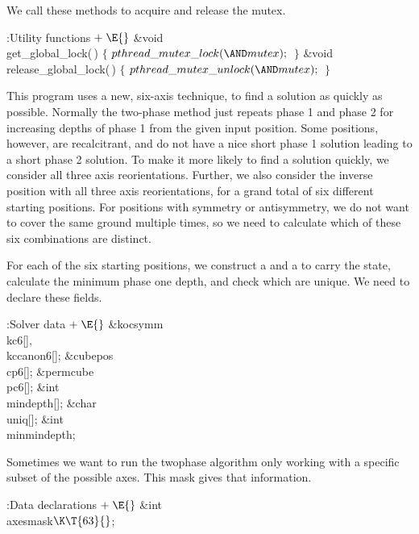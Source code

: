 We call these methods to acquire and release the mutex.

\Y\B\4:Utility functions\X${}\mathrel+\E{}$\6
\&{void} \\{get\_global\_lock}(\,)\1\1\2\2\6
${}\{{}$\1\6
${}\\{pthread\_mutex\_lock}({\AND}\\{mutex});{}$\6
\4${}\}{}$\2\7
\&{void} \\{release\_global\_lock}(\,)\1\1\2\2\6
${}\{{}$\1\6
${}\\{pthread\_mutex\_unlock}({\AND}\\{mutex});{}$\6
\4${}\}{}$\2\par
\fi

This program uses a new, six-axis technique, to find a solution as
quickly as possible.  Normally the two-phase method just repeats phase
1 and phase 2 for increasing depths of phase 1 from the given input
position.  Some positions, however, are recalcitrant, and do not have
a nice short phase 1 solution leading to a short phase 2 solution.  To
make it more likely to find a solution quickly, we consider all three
axis reorientations.  Further, we also consider the inverse position
with all three axis reorientations, for a grand total of six different
starting positions.  For positions with symmetry or antisymmetry, we
do not want to cover the same ground multiple times, so we need to
calculate which of these six combinations are distinct.

For each of the six starting positions, we construct a  and a
 to carry the state, calculate the minimum phase one depth,
and check which are unique.  We need to declare these fields.

\Y\B\4:Solver data\X${}\mathrel+\E{}$\6
\&{kocsymm} \\{kc6}[]${},{}$ \\{kccanon6}[];\6
\&{cubepos} \\{cp6}[];\6
\&{permcube} \\{pc6}[];\6
\&{int} \\{mindepth}[];\6
\&{char} \\{uniq}[];\6
\&{int} \\{minmindepth};\par
\fi

Sometimes we want to run the twophase algorithm only working
with a specific subset of the possible axes.  This mask gives
that information.

\Y\B\4:Data declarations\X${}\mathrel+\E{}$\6
\&{int} \\{axesmask}${}\K\T{63}{}$;\par
\fi

